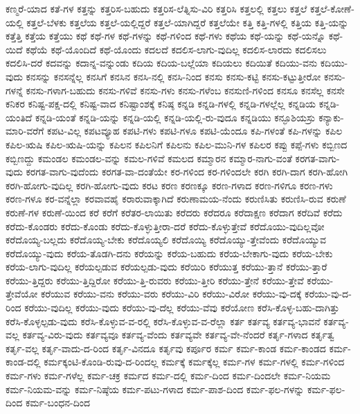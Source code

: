 {ಕಣ್ಮರೆ-ಯಾದ
ಕತೆ-ಗಳ
ಕತ್ತನ್ನು
ಕತ್ತರಿಸ-ಬಹುದು
ಕತ್ತರಿಸ-ಲೆತ್ನಿಸು-ವಿರಿ
ಕತ್ತರಿಸಿ
ಕತ್ತಲಲ್ಲಿ
ಕತ್ತಲು
ಕತ್ತಲೆ
ಕತ್ತಲೆ-ಕೋಣೆ-ಯಲ್ಲಿ
ಕತ್ತಲೆ-ಬೆಳಕು
ಕತ್ತಲೆಯ
ಕತ್ತಲೆ-ಯಲ್ಲಿದ್ದರೆ
ಕತ್ತಲೆ-ಯಾಗಿದ್ದರೆ
ಕತ್ತಲೆಯೇ
ಕತ್ತಿ
ಕತ್ತಿ-ಗಳಲ್ಲಿ
ಕತ್ತಿಯ
ಕತ್ತಿ-ಯನ್ನು
ಕತ್ತೆತ್ತಿ
ಕತ್ತೆಯ
ಕತ್ತೆಯು
ಕಥೆ
ಕಥೆ-ಗಳ
ಕಥೆ-ಗಳನ್ನು
ಕಥೆ-ಗಳಿಂದ
ಕಥೆ-ಗಳು
ಕಥೆಯ
ಕಥೆ-ಯನ್ನು
ಕಥೆ-ಯನ್ನೊ
ಕಥೆ-ಯಿದೆ
ಕಥೆಯೆ
ಕಥೆ-ಯೊಂದಿದೆ
ಕಥೆ-ಯೊಂದು
ಕದಲದೆ
ಕದಲಿಸ-ಲಾಗು-ವುದಿಲ್ಲ
ಕದಲಿಸ-ಲಾರದು
ಕದಲಿಸಲು
ಕದಲಿಸಿ-ದರೆ
ಕದವನ್ನು
ಕದಾನ್ನ-ವನ್ನುಂಡು
ಕದಿಯ
ಕದಿಯ-ಬಲ್ಲೆಯಾ
ಕದಿಯಲು
ಕದಿಯಿತೆ
ಕದಿಯು-ವನು
ಕದಿಯು-ವುದು
ಕನಸನ್ನು
ಕನಸನ್ನೆಲ್ಲ
ಕನಸಿಗೆ
ಕನಸಿನ
ಕನಸಿ-ನಲ್ಲಿ
ಕನಸಿ-ನಿಂದ
ಕನಸು
ಕನಸು-ಕಟ್ಟಿ
ಕನಸು-ಕಟ್ಟುತ್ತೀರೋ
ಕನಸು-ಗಳನ್ನೆ
ಕನಸು-ಗಳಾಗ-ಬಹುದು
ಕನಸು-ಗಳಿವೆ
ಕನಸು-ಗಳು
ಕನಸು-ಗಳೆಂಬ
ಕನಸುಣಿ-ಗಳಿಂದ
ಕನಸೂ
ಕನಸೆಲ್ಲ
ಕನಸೇ
ಕನಿಕರ
ಕನಿಷ್ಟ-ಪಕ್ಷ-ದಲ್ಲಿ
ಕನಿಷ್ಟ-ವಾದ
ಕನಿಷ್ಟಾಂಶಕ್ಕೆ
ಕನಿಷ್ಠ
ಕನ್ನಡಿ
ಕನ್ನಡಿ-ಗಳಲ್ಲಿ
ಕನ್ನಡಿ-ಗಳಲ್ಲೆಲ್ಲ
ಕನ್ನಡಿಯ
ಕನ್ನಡಿ-ಯಂತಿದೆ
ಕನ್ನಡಿ-ಯಂತೆ
ಕನ್ನಡಿ-ಯನ್ನು
ಕನ್ನಡಿ-ಯಲ್ಲಿ
ಕನ್ನಡಿ-ಯಲ್ಲಿ-ರು-ವುದೂ
ಕನ್ನಡಿಯು
ಕನ್ಫೂಶಿಯಸ್ರು
ಕನ್ಯಾಕು-ಮಾರಿ-ವರೆಗೆ
ಕಪಟ-ವಿಲ್ಲ
ಕಪಟವ್ಯೂಹ
ಕಪಟಿ-ಗಳು
ಕಪಟಿ-ಗಳೂ
ಕಪಟಿ-ಯೆಂದೂ
ಕಪಿ-ಗಳಂತೆ
ಕಪಿ-ಗಳನ್ನು
ಕಪಿಲ
ಕಪಿಲ-ಋಷಿ
ಕಪಿಲ-ಋಷಿ-ಯನ್ನು
ಕಪಿಲನ
ಕಪಿಲನಿಗೆ
ಕಪಿಲನು
ಕಪಿಲ-ಮುನಿ-ಗಳ
ಕಪಿಲರ
ಕಪ್ಪು
ಕಪ್ಪೆ-ಗಳು
ಕಬ್ಬಿಣದ
ಕಬ್ಬಿಣದ್ದು
ಕಮಂಡಲ
ಕಮಂಡಲ-ವನ್ನು
ಕಮಲ-ಗಳಿವೆ
ಕಮಲದ
ಕಮ್ಮಾರನ
ಕಮ್ಮಾರ-ನಾಗು-ವಂತೆ
ಕರಗತ-ವಾಗು-ವುದು
ಕರಗತ-ವಾಗು-ವುದೆಂದು
ಕರಗತ-ವಾ-ದಂತೆಯೇ
ಕರ-ಗಳಿಂದ
ಕರ-ಗಳಿಂದಲೇ
ಕರಗಿ
ಕರಗಿ-ದಾಗ
ಕರಗಿ-ಹೋಗಿ
ಕರಗಿ-ಹೋಗು-ವುದಿಲ್ಲ
ಕರಗಿ-ಹೋಗು-ವುದು
ಕರಟ
ಕರಣ
ಕರಣಕ್ಕೂ
ಕರಣ-ಗಳಾದ
ಕರಣ-ಗಳಿಗೂ
ಕರಣ-ಗಳು
ಕರಣ-ಗಳೂ
ಕರ-ವನ್ನೆಲ್ಲಾ
ಕರವಾವಹೈ
ಕರಾರುವಾಕ್ಕಾಗಿದೆ
ಕರುಣಾಮಯ-ನೆಂದು
ಕರುಣಿಸಿತು
ಕರುಣಿಸಿ-ರುವ
ಕರುಣೆ
ಕರುಣೆ-ಗಳ
ಕರುಣೆ-ಯಿಂದ
ಕರೆ
ಕರೆಗೆ
ಕರೆತರ-ಲಾಯಿತು
ಕರೆದರು
ಕರೆದರೂ
ಕರೆದಾಕ್ಷಣ
ಕರೆದಾಗ
ಕರೆದಿವೆ
ಕರೆದು
ಕರೆದು-ಕೊಂಡರು
ಕರೆದು-ಕೊಂಡು
ಕರೆದು-ಕೊಳ್ಳುತ್ತೀರಾ-ದರೆ
ಕರೆದು-ಕೊಳ್ಳುತ್ತೇವೆ
ಕರೆದೊಯು-ವುದಿಲ್ಲವೋ
ಕರೆದೊಯ್ಯ-ಬಲ್ಲದು
ಕರೆದೊಯ್ಯ-ಬೇಕು
ಕರೆದೊಯ್ಯಲಿ
ಕರೆದೊಯ್ಯಿ
ಕರೆದೊಯ್ಯು-ತ್ತೇವೆಂದು
ಕರೆದೊಯ್ಯುವ
ಕರೆದೊಯ್ಯು-ವುದು
ಕರೆಯ-ತೊಡಗಿ-ದನು
ಕರೆಯನ್ನು
ಕರೆಯ-ಬಹುದು
ಕರೆಯ-ಬೇಕಾಗು-ವುದು
ಕರೆಯ-ಬೇಕು
ಕರೆಯ-ಲಾಗು-ವುದಿಲ್ಲ
ಕರೆಯಲ್ಪಡುವ
ಕರೆಯಲ್ಪಡು-ವುದು
ಕರೆಯಿರಿ
ಕರೆಯುತ್ತ
ಕರೆಯು-ತ್ತಾನೆ
ಕರೆಯು-ತ್ತಾರೆ
ಕರೆಯು-ತ್ತಿದ್ದರು
ಕರೆಯು-ತ್ತಿದ್ದಿರೋ
ಕರೆಯು-ತ್ತಿ-ರುವರು
ಕರೆಯು-ತ್ತೀರಿ
ಕರೆಯು-ತ್ತೇನೆ
ಕರೆಯು-ತ್ತೇವೆ
ಕರೆಯು-ತ್ತೇವೆಯೋ
ಕರೆಯುವ
ಕರೆಯು-ವನು
ಕರೆಯು-ವರು
ಕರೆಯು-ವಿರಿ
ಕರೆಯು-ವಿರೋ
ಕರೆಯು-ವು-ದಕ್ಕೆ
ಕರೆಯು-ವು-ದ-ರಿಂದ
ಕರೆಯು-ವುದಿಲ್ಲ
ಕರೆಯು-ವುದು
ಕರೆಯು-ವು-ದೆಲ್ಲ
ಕರೆಯು-ವೆವು
ಕರೆಯೋಣ
ಕರೆಸಿ-ಕೊಳ್ಳ-ಬಹು-ದಾಗಿತ್ತು
ಕರೆಸಿ-ಕೊಳ್ಳಲ್ಪಡು-ವುದು
ಕರೆಸಿ-ಕೊಳ್ಳುವ-ವ-ರಲ್ಲಿ
ಕರೆಸಿ-ಕೊಳ್ಳುವ-ವ-ರೆಲ್ಲಾ
ಕರ್ತ
ಕರ್ತವ್ಯ
ಕರ್ತವ್ಯ-ಭಾವನೆ
ಕರ್ತವ್ಯ-ವಲ್ಲ
ಕರ್ತವ್ಯ-ವಿರು-ವುದು
ಕರ್ತವ್ಯವೂ
ಕರ್ತವ್ಯ-ವೆಂದು
ಕರ್ತವ್ಯವೇ
ಕರ್ತವ್ಯ-ವೇ-ನೆಂದರೆ
ಕರ್ತೃ-ಗಳಾದ
ಕರ್ತೃತ್ವ
ಕರ್ತೃ-ವಲ್ಲ
ಕರ್ತೃ-ವಾದು-ದ-ರಿಂದ
ಕರ್ತೃ-ವಿನದೂ
ಕರ್ತೃವು
ಕರ್ಪೂರ
ಕರ್ಮ
ಕರ್ಮ-ಕಾಂಡ
ಕರ್ಮ-ಕಾಂಡದ
ಕರ್ಮ-ಕಾಂಡ-ದಲ್ಲಿ
ಕರ್ಮಕ್ಕಂಟಿ-ಕೊಂಡಿ-ರುವು-ದ-ರಿಂದಲ್ಲ
ಕರ್ಮಕ್ಕೆ
ಕರ್ಮಕ್ಕೆಲ್ಲ
ಕರ್ಮ-ಗಳ
ಕರ್ಮ-ಗಳಲ್ಲಿ
ಕರ್ಮ-ಗಳಿಂದ
ಕರ್ಮ-ಗಳು
ಕರ್ಮ-ಗಳೆಲ್ಲ
ಕರ್ಮ-ಚಕ್ರ
ಕರ್ಮದ
ಕರ್ಮ-ದಲ್ಲಿ
ಕರ್ಮ-ದಿಂದ
ಕರ್ಮ-ದಿಂದಲೇ
ಕರ್ಮ-ನಿಯಮ
ಕರ್ಮ-ನಿಯಮ-ವನ್ನು
ಕರ್ಮ-ನಿಷ್ಠೆಯ
ಕರ್ಮ-ಪಟು-ಗಳಾದ
ಕರ್ಮ-ಪಾಶ-ದಿಂದ
ಕರ್ಮ-ಫಲ-ಗಳನ್ನು
ಕರ್ಮ-ಫಲ-ದಿಂದ
ಕರ್ಮ-ಬಂಧನ-ದಿಂದ
}
